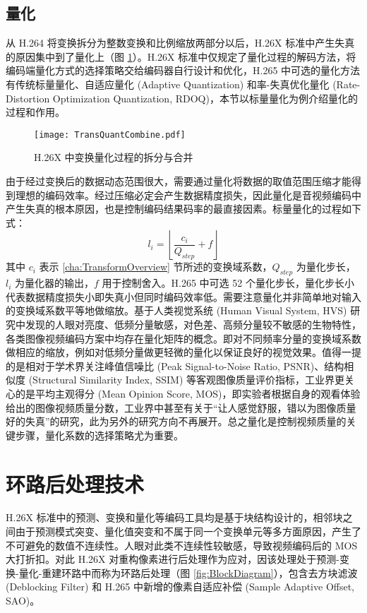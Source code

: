 \subsection{量化}
从 H.264 将变换拆分为整数变换和比例缩放两部分以后，H.26X 标准中产生失真的原因集中到了量化上（图 \ref{fig:TransQuantCombine}）。H.26X 标准中仅规定了量化过程的解码方法，将编码端量化方式的选择策略交给编码器自行设计和优化，H.265 中可选的量化方法有传统标量量化、自适应量化 (Adaptive Quantization) 和率-失真优化量化 (Rate-Distortion Optimization Quantization, RDOQ)，本节以标量量化为例介绍量化的过程和作用。 
\begin{figure}[htb]
    \centering
    \texttt{[image: TransQuantCombine.pdf]}
    \caption{H.26X 中变换量化过程的拆分与合并}
    \label{fig:TransQuantCombine}
\end{figure}

由于经过变换后的数据动态范围很大，需要通过量化将数据的取值范围压缩才能得到理想的编码效率。经过压缩必定会产生数据精度损失，因此量化是音视频编码中产生失真的根本原因，也是控制编码结果码率的最直接因素。标量量化的过程如下式：
\begin{equation}
    l_i=\left\lfloor \frac{c_i}{Q_{step}}+f \right\rfloor
\end{equation}
其中 $c_i$ 表示 \ref{cha:TransformOverview} 节所述的变换域系数，$Q_{step}$ 为量化步长，$l_i$ 为量化器的输出，$f$ 用于控制舍入。H.265 中可选 52 个量化步长，量化步长小代表数据精度损失小即失真小但同时编码效率低。需要注意量化并非简单地对输入的变换域系数平等地做缩放。基于人类视觉系统 (Human Visual System, HVS) 研究中发现的人眼对亮度、低频分量敏感，对色差、高频分量较不敏感的生物特性，各类图像视频编码方案中均存在量化矩阵的概念。即对不同频率分量的变换域系数做相应的缩放，例如对低频分量做更轻微的量化以保证良好的视觉效果。值得一提的是相对于学术界关注峰值信噪比 (Peak Signal-to-Noise Ratio, PSNR)、结构相似度 (Structural Similarity Index, SSIM) 等客观图像质量评价指标，工业界更关心的是平均主观得分 (Mean Opinion Score, MOS)，即实验者根据自身的观看体验给出的图像视频质量分数，工业界中甚至有关于“让人感觉舒服，错以为图像质量好的失真”的研究，此为另外的研究方向不再展开。总之量化是控制视频质量的关键步骤，量化系数的选择策略尤为重要。

\section{环路后处理技术}
H.26X 标准中的预测、变换和量化等编码工具均是基于块结构设计的，相邻块之间由于预测模式突变、量化值突变和不属于同一个变换单元等多方面原因，产生了不可避免的数值不连续性。人眼对此类不连续性较敏感，导致视频编码后的 MOS 大打折扣。对此 H.26X 对重构像素进行后处理作为应对，因该处理处于预测-变换-量化-重建环路中而称为环路后处理（图 \ref{fig:BlockDiagram}），包含去方块滤波 (Deblocking Filter) 和 H.265 中新增的像素自适应补偿 (Sample Adaptive Offset, SAO)。
